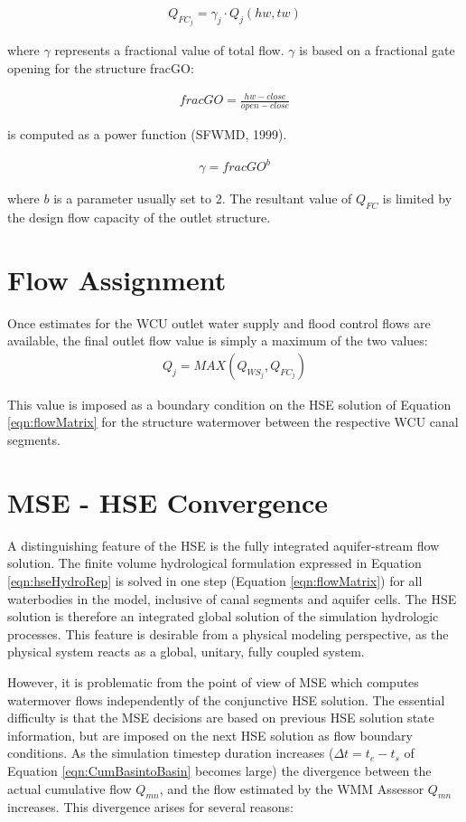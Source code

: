 \begin{align}\label{eqn:FCflow}
  Q_{FC_j} = \gamma_j \cdot Q_j(hw, tw)
\end{align}

where $\gamma$ represents a fractional value of total flow. $\gamma$
is based on a fractional gate opening for the structure fracGO:

\begin{align}
  fracGO = \frac {hw - close}{open - close}
\end{align}

 is computed as a power function (SFWMD, 1999).\nocite{sfwmm:99} 

\begin{align}
  \gamma = fracGO^b
\end{align}

where $b$ is a parameter usually set to 2. The resultant value of $Q_{FC}$
is limited by the design flow capacity of the outlet structure.

\section{Flow Assignment}
Once estimates for the WCU outlet water supply and flood control flows
are available, the final outlet flow value is simply a maximum of the
two values:
\begin{align}
  Q_j = MAX(Q_{WS_j}, Q_{FC_j})
\end{align}

This value is imposed as a boundary condition on the HSE solution of
Equation \ref{eqn:flowMatrix} for the structure watermover between the
respective WCU canal segments.

\section{MSE - HSE Convergence}\label{InfoMismatch}
A distinguishing feature of the HSE is the fully integrated
aquifer-stream flow solution. The finite volume hydrological
formulation expressed in Equation \ref{eqn:hseHydroRep} is solved in
one step (Equation \ref{eqn:flowMatrix}) for all waterbodies in the
model, inclusive of canal segments and aquifer cells. The HSE solution
is therefore an integrated global solution of the simulation
hydrologic processes. This feature is desirable from a physical
modeling perspective, as the physical system reacts as a global,
unitary, fully coupled system.

However, it is problematic from the point of view of MSE which
computes watermover flows independently of the conjunctive HSE
solution. The essential difficulty is that the MSE decisions are based
on previous HSE solution state information, but are imposed on the
next HSE solution as flow boundary conditions. As the simulation
timestep duration increases ($\Delta t = t_e - t_s$ of Equation
\ref{eqn:CumBasintoBasin} becomes large) the divergence between the
actual cumulative flow $Q_{mn}$, and the flow estimated by the WMM Assessor
$Q_{mn}$ increases. This divergence arises for several reasons:

